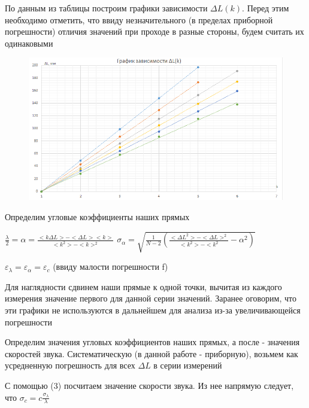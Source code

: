 \documentclass[12pt,a4paper]{article}
\begin{document}
По данным из таблицы построим графики зависимости $\Delta{L}(k)$. Перед этим необходимо отметить, что ввиду незначительного (в пределах приборной погрешности) отличия значений при проходе в разные стороны, будем считать их одинаковыми


\begin{figure}[H]
	\begin{center}
		\includegraphics[width=14cm]{2.1.3_gr_1}
	\end{center}
\end{figure}

Определим угловые коэффициенты наших прямых

$\frac{\lambda}{2}=\alpha=\frac{<k\Delta{L}>-<\Delta{L}><k>}{<k^2>-<k>^2}$ \;\;\;\;\;\;\; $\sigma_{\alpha}=\sqrt{\frac{1}{N-2}(\frac{<{\Delta{L}}^2>-<\Delta{L}>^2}{<k^2>-<k^2}-{\alpha}^2)}$

$\varepsilon_{\lambda} = \varepsilon_{\alpha} = \varepsilon_{c}$ (ввиду малости погрешности f)

Для наглядности сдвинем наши прямые к одной точки, вычитая из каждого измерения значение первого для данной серии значений. Заранее оговорим, что эти графики не используются в дальнейшем для анализа из-за увеличивающейся погрешности

Определим значения угловых коэффициентов наших прямых, а после - значения скоростей звука. Систематическую (в данной работе - приборную), возьмем как усредненную погрешность для всех $\Delta{L}$ в серии измерений

С помощью (3) посчитаем значение скорости звука. Из нее напрямую следует, что $\sigma_{c} = c\frac{\sigma_{\lambda}}{\lambda}$
\end{document}
